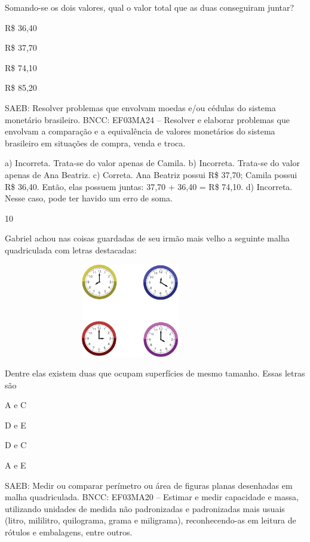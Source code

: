 \begin{multicols}{2}
\begin{enumerate}
{%

Somando-se os dois valores, qual o valor total que as duas conseguiram juntar?

\begin{escolha}
\item
  R\$ 36,40
\item
  R\$ 37,70
\item
  R\$ 74,10
\item
  R\$ 85,20
\end{escolha}

SAEB: Resolver problemas que envolvam moedas e/ou cédulas do
sistema monetário brasileiro.
BNCC: EF03MA24 -- Resolver e elaborar problemas que envolvam a comparação e a equivalência de
valores monetários do sistema brasileiro em situações de compra, venda e troca.

a) Incorreta. Trata-se do valor apenas de Camila.
b) Incorreta. Trata-se do valor apenas de Ana Beatriz.
c) Correta. Ana Beatriz possui R\$ 37,70; Camila possui R\$ 36,40. Então, elas possuem juntas: 37,70 + 36,40 = R\$ 74,10.
d) Incorreta. Nesse caso, pode ter havido um erro de soma.

\num{10}

Gabriel achou nas coisas guardadas de seu irmão mais velho a seguinte malha quadriculada com letras destacadas:


\includegraphics[width=4.36538in,height=1.60417in]{media/image111.png}

Dentre elas existem duas que ocupam superfícies de mesmo tamanho. Essas letras são

\begin{escolha}
\item
  A e C
\item
  D e E
\item
  D e C
\item
  A e E
\end{escolha}

SAEB: Medir ou comparar perímetro ou área de figuras planas
desenhadas em malha quadriculada.
BNCC: EF03MA20 -- Estimar e medir capacidade e massa, utilizando unidades de medida não
padronizadas e padronizadas mais usuais (litro, mililitro, quilograma, grama e miligrama),
reconhecendo-as em leitura de rótulos e embalagens, entre outros.

}
\end{enumerate}
\end{multicols}
